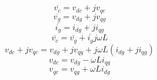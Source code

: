 \begin{equation}
\overline{v_{c}}=v_{dc}+jv_{qc}
\label{crossilk}
\end{equation}
\begin{equation}
\overline{v_{g}}=v_{dg}+jv_{qg}
\end{equation}
\begin{equation}
\overline{i_{g}}=i_{dg}+ji_{qg}
\end{equation}
\begin{equation}
\overline{v_{c}}=\overline{v_{g}}+\overline{i_{g}}j\omega L
\end{equation}
\begin{equation}
v_{dc}+jv_{qc}=v_{dg}+jv_{qg}+j\omega L (i_{dg}+ji_{qg})
\end{equation}
\begin{equation}
v_{dc}=v_{dg}-\omega L i_{qg}
\label{crosscomp1}
\end{equation}
\begin{equation}
v_{qc}=v_{qg}+\omega L i_{dg}
\label{crosscomp2}
\end{equation}
